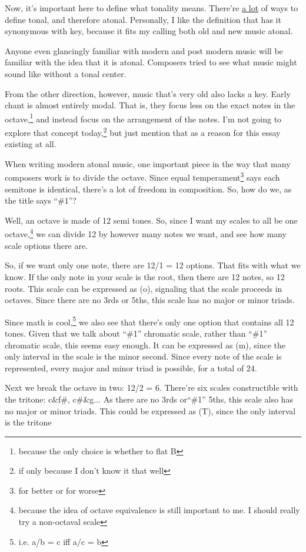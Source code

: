 \documentclass[12pt]{article}[titlepage]
\newcommand{\say}[1]{``\#1''}
\newcommand{\1}{\={a}}
\newcommand{\2}{\={e}}
\newcommand{\3}{\={\i}}
\newcommand{\4}{\=o}
\newcommand{\5}{\=u}
\newcommand{\6}{\={A}}
\renewcommand{\,}{\textsuperscript{,}}
\begin{document}
Now, it's important here to define what tonality means.
There're \href{https://en.wikipedia.org/wiki/Tonality}{a lot} of ways to define tonal, and therefore atonal.
Personally, I like the definition that has it synonymous with key, because it fits my calling both old and new music atonal.

Anyone even glancingly familiar with modern and post modern music will be familiar with the idea that it is atonal.
Composers tried to see what music might sound like without a tonal center.

From the other direction, however, music that's very old also lacks a key.
Early chant is almost entirely modal.
That is, they focus less on the exact notes in the octave,\footnote{because the only choice is whether to flat B} and instead focus on the arrangement of the notes.
I'm not going to explore that concept today,\footnote{if only because I don't know it that well} but just mention that as a reason for this essay existing at all.

When writing modern atonal music, one important piece in the way that many composers work is to divide the octave.
Since equal temperament\footnote{for better or for worse} says each semitone is identical, there's a lot of freedom in composition.
So, how do we, as the title says \say{Break the Octave}?

Well, an octave is made of 12 semi tones.
So, since I want my scales to all be one octave,\footnote{because the idea of octave equivalence is still important to me. I should really try a non-octaval scale} we can divide 12 by however many notes we want, and see how many scale options there are.

So, if we want only one note, there are 12/1 = 12 options.
That fits with what we know.
If the only note in your scale is the root, then there are 12 notes, so 12 roots.
This scale can be expressed as (o), signaling that the scale proceeds in octaves.
Since there are no 3rds or 5ths, this scale has no major or minor triads.

Since math is cool,\footnote{i.e. a/b = c iff a/c = b} we also see that there's only one option that contains all 12 tones.
Given that we talk about \say{the} chromatic scale, rather than \say{a} chromatic scale, this seems easy enough.
It can be expressed as (m), since the only interval in the scale is the minor second.
Since every note of the scale is represented, every major and minor triad is possible, for a total of 24.

Next we break the octave in two: 12/2 = 6.
There're six scales constructible with the tritone: c\&f\#, c\#\&g...
As there are no 3rds or\say{perfect} 5ths, this scale also has no major or minor triads.
This could be expressed as (T), since the only interval is the tritone
\end{document}
